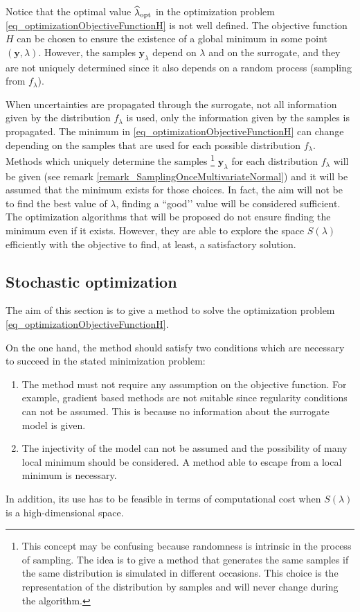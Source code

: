 \begin{remark} \label{remark_optimizationWithRandom}
Notice that the optimal value $\widehat{\lambda}_{\textup{opt}}$ in the optimization problem \ref{eq_optimizationObjectiveFunctionH} is not well defined. 
The objective function $H$ can be chosen to ensure the existence of a global minimum in some point $(\pmb{y},\lambda)$. 
However, the samples $\pmb{y}_{\lambda}$ depend on $\lambda$ and on the surrogate, and they are not uniquely determined since it also depends on a random process (sampling from $f_{\lambda}$). 

When uncertainties are propagated through the surrogate, not all information given by the distribution $f_{\lambda}$ is used, only the information given by the samples is propagated. 
The minimum in \ref{eq_optimizationObjectiveFunctionH} can change depending on the samples that are used for each possible distribution $f_{\lambda}$. 
Methods which uniquely determine the samples
\footnote{This concept may be confusing because randomness is intrinsic in the process of sampling. The idea is to give a method that generates the same samples if the same distribution is simulated in different occasions. This choice is the representation of the distribution by samples and will never change during the algorithm.}
 $\pmb{y}_{\lambda}$ for each distribution $f_{\lambda}$ will be given (see remark \ref{remark_SamplingOnceMultivariateNormal}) and it will be assumed that the minimum exists for those choices.
In fact, the aim will not be to find the best value of $\lambda$, finding a ``good’’ value will be considered sufficient.
The optimization algorithms that will be proposed do not ensure finding the minimum even if it exists.
However, they are able to explore the space $S(\lambda)$ efficiently with the objective to find, at least, a satisfactory solution.
\end{remark}

\subsection{Stochastic optimization} \label{sec_StochasticOptimization}

The aim of this section is to give a method to solve the optimization problem \ref{eq_optimizationObjectiveFunctionH}.

On the one hand, the method should satisfy two conditions which are necessary to succeed in the stated minimization problem:
\begin{enumerate}
  \item The method must not require any assumption on the objective function. For example, gradient based methods are not suitable since regularity conditions can not be assumed. This is because no information about the surrogate model is given. %
  \item The injectivity of the model can not be assumed and the possibility of many local minimum should be considered. A method able to escape from a local minimum is necessary. 
\end{enumerate}
In addition, its use has to be feasible in terms of computational cost when $S(\lambda)$ is a high-dimensional space.

